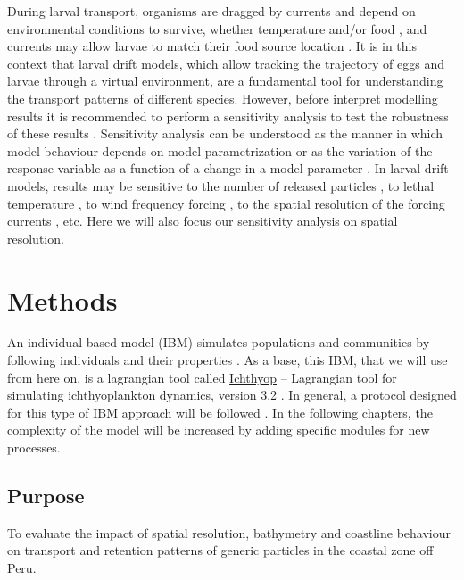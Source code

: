 During larval transport, organisms are dragged by currents and depend on environmental conditions to survive, whether temperature and/or food \citep{NocrShaw1984}, and currents may allow larvae to match their food source location \citep{CuryRoy1989}. It is in this context that larval drift models, which allow tracking the trajectory of eggs and larvae through a virtual environment, are a fundamental tool for understanding the transport patterns of different species. However, before interpret modelling results it is recommended to perform a sensitivity analysis to test the robustness of these results \citep{PeckHufn2012,SimoSieg2013}. Sensitivity analysis can be understood as the manner in which model behaviour depends on model parametrization or as the variation of the response variable as a function of a change in a model parameter \citep{Hamb1994,Inga2008}. In larval drift models, results may be sensitive to the number of released particles \citep{SimoSieg2013}, to lethal temperature \citep{BrocLett2008}, to wind frequency forcing \citep{FlorTam2019}, to the spatial resolution of the forcing currents \citep{GaraKapl2014}, etc. Here we will also focus our sensitivity analysis on spatial resolution.\\

\clearpage

\section{Methods}\label{Chap2Meth}

An individual-based model (IBM) simulates populations and communities by following individuals and their properties \citep{DeanGrim2014}. As a base, this IBM, that we will use from here on, is a lagrangian tool called \href{https://ichthyop.org/}{Ichthyop} – Lagrangian tool for simulating ichthyoplankton dynamics, version 3.2 \citep{LettVerl2008}. In general, a protocol designed for this type of IBM approach will be followed \citep{GrimBerg2006,GrimBerg2010}. In the following chapters, the complexity of the model will be increased by adding specific modules for new processes.\\

\subsection{Purpose}\label{Chap2MethPurp}

To evaluate the impact of spatial resolution, bathymetry and coastline behaviour on transport and retention patterns of generic particles in the coastal zone off Peru.\\

